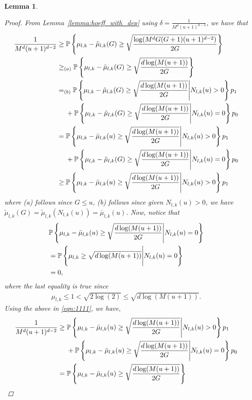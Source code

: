 \documentclass[12pt,draftcls, onecolumn]{IEEEtran}
\newtheorem{lemma}{Lemma}
\begin{document}
{\begin{lemma}
\begin{proof}
     From Lemma~\ref{lemma:hoeff_with_dep} using $\delta = \frac{1}{M^d(u+1)^{d-2}}$, we have that
     \begin{align}\label{eqn:1111}
         \frac{1}{M^d(u+1)^{d-2}} &\geq \mathbb{P}\left\{  \mu_{l,k}-\tilde{\mu}_{l,k}(G) \geq \sqrt{\frac{\log(M^dG(G+1)(u+1)^{d-2})}{2G}}\right\} \nonumber\\& \geq_{(a)} \mathbb{P}\left\{  \mu_{l,k}-\tilde{\mu}_{l,k}(G) \geq \sqrt{\frac{d\log(M(u+1))}{2G}}\right\} \nonumber\\& =_{(b)}  \mathbb{P}\left\{  \mu_{l,k}-\tilde{\mu}_{l,k}(G) \geq \sqrt{\frac{d\log(M(u+1))}{2G}} \Bigg{|} N_{l,k}(u) > 0\right\}p_1 \nonumber\\&\ \ \ \  + \mathbb{P}\left\{  \mu_{l,k}-\tilde{\mu}_{l,k}(G) \geq \sqrt{\frac{d\log(M(u+1))}{2G}} \Bigg{|} N_{l,k}(u) = 0\right\}p_0\nonumber\\& =  \mathbb{P}\left\{  \mu_{l,k}-\bar{\mu}_{l,k}(u)  \geq\sqrt{\frac{d\log(M(u+1))}{2G}} \Bigg{|} N_{l,k}(u) > 0\right\}p_1  \nonumber\\&\ \ \ \ + \mathbb{P}\left\{  \mu_{l,k}-\tilde{\mu}_{l,k}(G) \geq \sqrt{\frac{d\log(M(u+1))}{2G}} \Bigg{|} N_{l,k}(u) = 0\right\}p_0\nonumber\\& \geq  \mathbb{P}\left\{  \mu_{l,k}-\bar{\mu}_{l,k}(u)  \geq\sqrt{\frac{d\log(M(u+1))}{2G}} \Bigg{|} N_{l,k}(u) > 0\right\}p_1
     \end{align}
     where (a) follows since $G \leq u$, (b) follows since given $N_{l,k}(u) > 0$, we have $\tilde{\mu}_{l,k}(G)= \tilde{\mu}_{l,k}(N_{l,k}(u)) = \bar{\mu}_{l,k}(u)$. Now, notice that
     \begin{align}
         &\mathbb{P}\left\{  \mu_{l,k}-\bar{\mu}_{l,k}(u)  \geq\sqrt{\frac{d\log(M(u+1))}{2G}} \Bigg{|} N_{l,k}(u) = 0\right\}  \nonumber\\& = \mathbb{P}\left\{  \mu_{l,k}  \geq\sqrt{d\log(M(u+1))} \Bigg{|} N_{l,k}(u) = 0\right\} \nonumber\\&= 0, \nonumber
     \end{align}
     where the last equality is true since
     \begin{align}
         \mu_{l,k} \leq 1 < \sqrt{2\log(2)} \leq \sqrt{d\log(M(u+1))}. \nonumber
     \end{align}
     Using the above in \eqref{eqn:1111}, we have,
     \begin{align}
         \frac{1}{M^d(u+1)^{d-2}}&\geq\mathbb{P}\left\{  \mu_{l,k}-\bar{\mu}_{l,k}(u)  \geq\sqrt{\frac{d\log(M(u+1))}{2G}} \Bigg{|} N_{l,k}(u) > 0\right\}p_1\nonumber\\&\ \ \ \  + \mathbb{P}\left\{  \mu_{l,k}-\bar{\mu}_{l,k}(u)  \geq\sqrt{\frac{d\log(M(u+1))}{2G}} \Bigg{|} N_{l,k}(u) = 0\right\}p_0  \nonumber\\& = \mathbb{P}\left\{  \mu_{l,k}-\bar{\mu}_{l,k}(u)  \geq\sqrt{\frac{d\log(M(u+1))}{2G}}\right\} \nonumber

\end{align}
\end{proof}
\end{lemma}}
\end{document}
